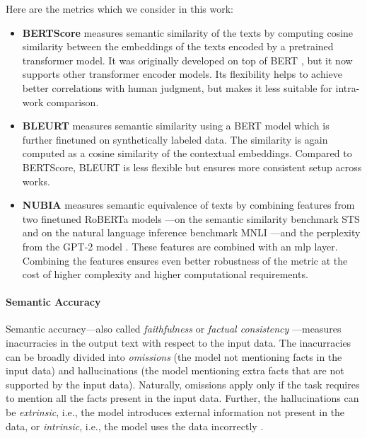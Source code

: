 Here are the metrics which we consider in this work:

\begin{itemize}
    \item \textbf{BERTScore} \cite{zhang2019bertscore} measures semantic similarity of the texts by computing cosine similarity between the embeddings of the texts encoded by a pretrained transformer model. It was originally developed on top of BERT \cite{devlinBERTPretrainingDeep2019}, but it now supports other transformer encoder models. Its flexibility helps to achieve better correlations with human judgment, but makes it less suitable for intra-work comparison.
    \item \textbf{BLEURT} \cite{sellam2020bleurt} measures semantic similarity using a BERT model \cite{devlinBERTPretrainingDeep2019} which is further finetuned on synthetically labeled data. The similarity is again computed as a cosine similarity of the contextual embeddings. Compared to BERTScore, BLEURT is less flexible but ensures more consistent setup across works.
    \item \textbf{NUBIA} \cite{kaneNUBIANeUralBased2020} measures semantic equivalence of texts by combining features from two finetuned RoBERTa models \cite{liuRoBERTaRobustlyOptimized2019}---on the semantic similarity benchmark STS \cite{cer-etal-2017-semeval} and on the natural language inference benchmark MNLI \cite{williams2018mnli}---and the perplexity from the GPT-2 model \cite{radford2019language}. These features are combined with an \ac{mlp} layer. Combining the features ensures even better robustness of the metric at the cost of higher complexity and higher computational requirements.
\end{itemize}

\paragraph{Semantic Accuracy} Semantic accuracy---also called \emph{faithfulness} or \emph{factual consistency} \cite{celikyilmazEvaluationTextGeneration2021}---measures inacurracies in the output text with respect to the input data. The inacurracies can be broadly divided into \emph{omissions} (the model not mentioning facts in the input data) and hallucinations (the model mentioning extra facts that are not supported by the input data). Naturally, omissions apply only if the task requires to mention all the facts present in the input data. Further, the hallucinations can be \emph{extrinsic}, i.e., the model introduces external information not present in the data, or \emph{intrinsic}, i.e., the model uses the data incorrectly \cite{maynezFaithfulnessFactualityAbstractive2020}.

